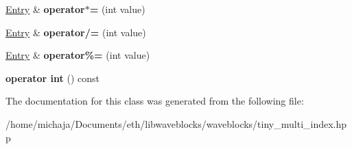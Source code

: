 \begin{DoxyCompactItemize}
\item 
\hypertarget{classwaveblocks_1_1_tiny_multi_index_1_1_entry_a91a1de9c061a29eea2e8677a2f25cb54}{}\hyperlink{classwaveblocks_1_1_tiny_multi_index_1_1_entry}{Entry} \& {\bfseries operator$\ast$=} (int value)\label{classwaveblocks_1_1_tiny_multi_index_1_1_entry_a91a1de9c061a29eea2e8677a2f25cb54}

\item 
\hypertarget{classwaveblocks_1_1_tiny_multi_index_1_1_entry_a14ca00a0a571386267acc2489c7db6c8}{}\hyperlink{classwaveblocks_1_1_tiny_multi_index_1_1_entry}{Entry} \& {\bfseries operator/=} (int value)\label{classwaveblocks_1_1_tiny_multi_index_1_1_entry_a14ca00a0a571386267acc2489c7db6c8}

\item 
\hypertarget{classwaveblocks_1_1_tiny_multi_index_1_1_entry_a7b23682ebb52f09092255e8465e9e250}{}\hyperlink{classwaveblocks_1_1_tiny_multi_index_1_1_entry}{Entry} \& {\bfseries operator\%=} (int value)\label{classwaveblocks_1_1_tiny_multi_index_1_1_entry_a7b23682ebb52f09092255e8465e9e250}

\item 
\hypertarget{classwaveblocks_1_1_tiny_multi_index_1_1_entry_a56d7e2587062a5899875ae9e792cf4c0}{}{\bfseries operator int} () const \label{classwaveblocks_1_1_tiny_multi_index_1_1_entry_a56d7e2587062a5899875ae9e792cf4c0}

\end{DoxyCompactItemize}


The documentation for this class was generated from the following file\+:\begin{DoxyCompactItemize}
\item 
/home/michaja/\+Documents/eth/libwaveblocks/waveblocks/tiny\+\_\+multi\+\_\+index.\+hpp\end{DoxyCompactItemize}
